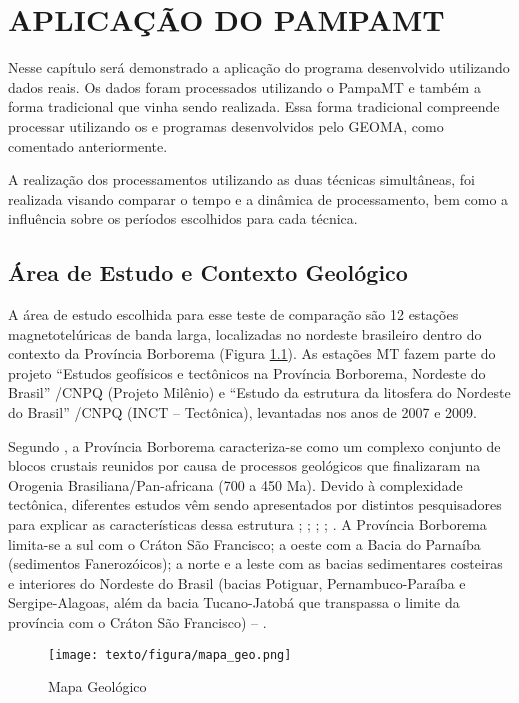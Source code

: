 \chapter{APLICAÇÃO DO PAMPAMT}
    
    Nesse capítulo será demonstrado a aplicação do programa desenvolvido utilizando dados reais. Os dados foram processados utilizando o PampaMT e também a forma tradicional que vinha sendo realizada. Essa forma tradicional compreende processar utilizando os  e programas desenvolvidos pelo GEOMA, como comentado anteriormente.
    
    A realização dos processamentos utilizando as duas técnicas simultâneas, foi realizada visando comparar o tempo e a dinâmica de processamento, bem como a influência sobre os períodos escolhidos para cada técnica.  
    
    \section{Área de Estudo e Contexto Geológico}
        
        A área de estudo escolhida para esse teste de comparação são 12 estações magnetotelúricas de banda larga, localizadas no nordeste brasileiro dentro do contexto da Província Borborema (Figura \ref{local-bor}). As estações MT fazem parte do projeto ``Estudos geofísicos e tectônicos na Província Borborema, Nordeste do Brasil” /CNPQ (Projeto Milênio) e “Estudo da estrutura da litosfera do Nordeste do Brasil” /CNPQ (INCT – Tectônica), levantadas nos anos de 2007 e 2009.
    
    Segundo \cite{almeida}, a Província Borborema caracteriza-se como um complexo conjunto de blocos crustais reunidos por causa de processos geológicos que finalizaram na Orogenia Brasiliana/Pan-africana (700 a 450 Ma). Devido à complexidade tectônica, diferentes estudos vêm sendo apresentados por distintos pesquisadores para explicar as características dessa estrutura \cite{van}; \cite{teseandrea}; \cite{santos2014deep}; \cite{padilha}; \cite{barbosa}. A Província Borborema limita-se a sul com o Cráton São Francisco; a oeste com a Bacia do Parnaíba (sedimentos Fanerozóicos); a norte e a leste com as bacias sedimentares costeiras e interiores do Nordeste do Brasil (bacias Potiguar, Pernambuco-Paraíba e Sergipe-Alagoas, além da bacia Tucano-Jatobá que transpassa o limite da província com o Cráton São Francisco) -- \cite{medeiros}.    
    
    \begin{figure}[h]
        \caption{Mapa Geológico}
            \begin{center}
                \texttt{[image: texto/figura/mapa\_geo.png]}
            \end{center}
        \label{local-bor}
    \end{figure}
        
